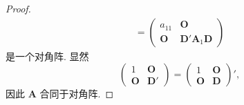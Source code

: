 \documentclass[../../main.tex]{subfiles}
\begin{document}
\begin{proof}
\begin{align*}
=
\begin{pmatrix}
a_{11} & \boldsymbol{O} \\
\boldsymbol{O} & \boldsymbol{D}'\boldsymbol{A}_1\boldsymbol{D}
\end{pmatrix}
\end{align*}
是一个对角阵. 显然
\[
\begin{pmatrix}
1 & \boldsymbol{O} \\
\boldsymbol{O} & \boldsymbol{D}'
\end{pmatrix}
=
\begin{pmatrix}
1 & \boldsymbol{O} \\
\boldsymbol{O} & \boldsymbol{D}
\end{pmatrix}',
\]
因此 $\boldsymbol{A}$ 合同于对角阵.
\end{proof}
\end{document}
